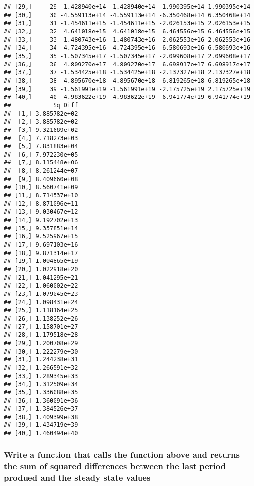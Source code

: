 \documentclass{article}\usepackage[]{graphicx}\usepackage[]{color}
\makeatletter
\newenvironment{kframe}{%
 \def\at@end@of@kframe{}%
 \ifinner\ifhmode%
  \def\at@end@of@kframe{\end{minipage}}%
  \begin{minipage}{\columnwidth}%
 \fi\fi%
 \def\FrameCommand##1{\hskip\@totalleftmargin \hskip-\fboxsep
 \colorbox{shadecolor}{##1}\hskip-\fboxsep
     \hskip-\linewidth \hskip-\@totalleftmargin \hskip\columnwidth}%
 \MakeFramed {\advance\hsize-\width
   \@totalleftmargin\z@ \linewidth\hsize
   \@setminipage}}%
 {\par\unskip\endMakeFramed%
 \at@end@of@kframe}
\newenvironment{knitrout}{}{} %
\makeatother
\begin{document}
\begin{knitrout}
\begin{kframe}
\begin{verbatim}
## [29,]     29 -1.428940e+14 -1.428940e+14 -1.990395e+14 1.990395e+14
## [30,]     30 -4.559113e+14 -4.559113e+14 -6.350468e+14 6.350468e+14
## [31,]     31 -1.454611e+15 -1.454611e+15 -2.026153e+15 2.026153e+15
## [32,]     32 -4.641018e+15 -4.641018e+15 -6.464556e+15 6.464556e+15
## [33,]     33 -1.480743e+16 -1.480743e+16 -2.062553e+16 2.062553e+16
## [34,]     34 -4.724395e+16 -4.724395e+16 -6.580693e+16 6.580693e+16
## [35,]     35 -1.507345e+17 -1.507345e+17 -2.099608e+17 2.099608e+17
## [36,]     36 -4.809270e+17 -4.809270e+17 -6.698917e+17 6.698917e+17
## [37,]     37 -1.534425e+18 -1.534425e+18 -2.137327e+18 2.137327e+18
## [38,]     38 -4.895670e+18 -4.895670e+18 -6.819265e+18 6.819265e+18
## [39,]     39 -1.561991e+19 -1.561991e+19 -2.175725e+19 2.175725e+19
## [40,]     40 -4.983622e+19 -4.983622e+19 -6.941774e+19 6.941774e+19
##            Sq Diff
##  [1,] 3.885782e+02
##  [2,] 3.885782e+02
##  [3,] 9.321689e+02
##  [4,] 7.718273e+03
##  [5,] 7.831883e+04
##  [6,] 7.972230e+05
##  [7,] 8.115448e+06
##  [8,] 8.261244e+07
##  [9,] 8.409660e+08
## [10,] 8.560741e+09
## [11,] 8.714537e+10
## [12,] 8.871096e+11
## [13,] 9.030467e+12
## [14,] 9.192702e+13
## [15,] 9.357851e+14
## [16,] 9.525967e+15
## [17,] 9.697103e+16
## [18,] 9.871314e+17
## [19,] 1.004865e+19
## [20,] 1.022918e+20
## [21,] 1.041295e+21
## [22,] 1.060002e+22
## [23,] 1.079045e+23
## [24,] 1.098431e+24
## [25,] 1.118164e+25
## [26,] 1.138252e+26
## [27,] 1.158701e+27
## [28,] 1.179518e+28
## [29,] 1.200708e+29
## [30,] 1.222279e+30
## [31,] 1.244238e+31
## [32,] 1.266591e+32
## [33,] 1.289345e+33
## [34,] 1.312509e+34
## [35,] 1.336088e+35
## [36,] 1.360091e+36
## [37,] 1.384526e+37
## [38,] 1.409399e+38
## [39,] 1.434719e+39
## [40,] 1.460494e+40
\end{verbatim}
\end{kframe}
\end{knitrout}

\subsubsection{Write a function that calls the function above and returns the sum of squared differences between the last period produed and the steady state values}
\end{document}

